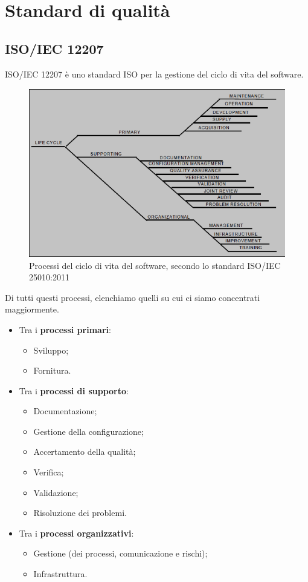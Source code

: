\section{Standard di qualità}
\subsection{ISO/IEC 12207}
ISO/IEC 12207 è uno standard ISO per la gestione del ciclo di vita del software.\\
\begin{figure}[h!]
	\centering
	\includegraphics[scale=0.4]{res/images/ISO_12207.png}
	\caption{Processi del ciclo di vita del software, secondo lo standard ISO/IEC 25010:2011}
\end{figure}
Di tutti questi processi, elenchiamo quelli su cui ci siamo concentrati maggiormente.
\begin{itemize}
    \item Tra i \textbf{processi primari}:
    \begin{itemize}
        \item Sviluppo;
        \item Fornitura.
    \end{itemize}
    \item Tra i \textbf{processi di supporto}:
    \begin{itemize}
        \item Documentazione;
        \item Gestione della configurazione;
        \item Accertamento della qualità;
        \item Verifica;
        \item Validazione;
        \item Risoluzione dei problemi.
    \end{itemize}
    \item Tra i \textbf{processi organizzativi}:
    \begin{itemize}
        \item Gestione (dei processi, comunicazione e rischi);
        \item Infrastruttura.
    \end{itemize}
\end{itemize}

